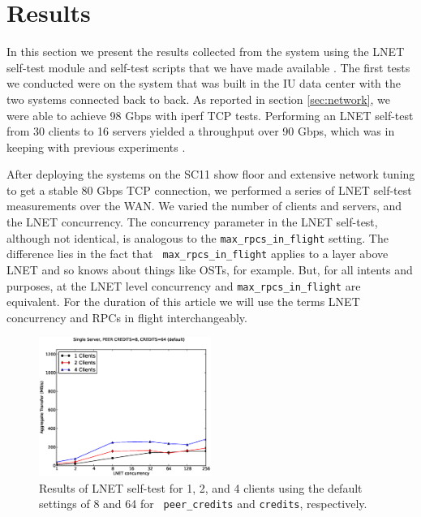 \documentclass[]{sigplan-proc}
\begin{document}
\section{Results}\label{sec:results}

In this section we present the results collected from the system using the LNET self-test module and self-test
scripts that we have made available \cite{lstgithub2011}. The first tests we conducted were on the system that
was built in the IU data center with the two systems connected back to back. As reported in section
\ref{sec:network}, we were able to achieve 98 Gbps with iperf TCP tests. Performing an LNET self-test from 30
clients to 16 servers yielded a throughput over 90 Gbps, which was in keeping with previous experiments
\cite{kluge2012}.

After deploying the systems on the SC11 show floor and extensive network tuning to get a stable 80 Gbps TCP
connection, we performed a series of LNET self-test measurements over the WAN. We varied the number of clients
and servers, and the LNET concurrency. The concurrency parameter in the LNET self-test, although not
identical, is analogous to the {\tt max\_rpcs\_in\_flight} setting. The difference lies in the fact that {\tt
  max\_rpcs\_in\_flight} applies to a layer above LNET and so knows about things like OSTs, for example. But,
for all intents and purposes, at the LNET level concurrency and {\tt max\_rpcs\_in\_flight} are
equivalent. For the duration of this article we will use the terms LNET concurrency and RPCs in flight
interchangeably.  

\begin{figure}
\centering
\includegraphics[width=0.50\textwidth]{figures/default_pc_plot.eps}
\caption{Results of LNET self-test for 1, 2, and 4 clients using the default settings of 8 and 64 for {\tt
    peer\_credits} and {\tt credits}, respectively.}
\label{fig:default}
\end{figure}
\end{document}
